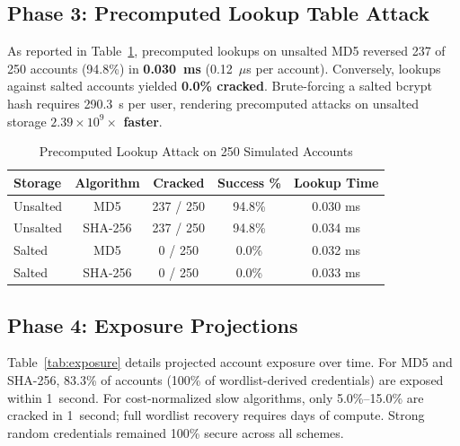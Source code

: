 \documentclass[conference]{IEEEtran}
\begin{document}
\subsection{Phase 3: Precomputed Lookup Table Attack}
As reported in Table~\ref{tab:rainbow}, precomputed lookups on unsalted MD5 reversed 237 of 250 accounts (94.8\%) in \textbf{0.030~ms} (0.12~$\mu$s per account). Conversely, lookups against salted accounts yielded \textbf{0.0\% cracked}. Brute-forcing a salted bcrypt hash requires 290.3~s per user, rendering precomputed attacks on unsalted storage \textbf{$2.39 \times 10^9\times$ faster}.

\begin{table}[htbp]
\caption{Precomputed Lookup Attack on 250 Simulated Accounts}
\begin{center}
\begin{tabular}{lcccc}
\toprule
\textbf{Storage} & \textbf{Algorithm} & \textbf{Cracked} & \textbf{Success \%} & \textbf{Lookup Time} \\
\midrule
Unsalted & MD5 & 237 / 250 & 94.8\% & 0.030 ms \\
Unsalted & SHA-256 & 237 / 250 & 94.8\% & 0.034 ms \\
Salted & MD5 & 0 / 250 & 0.0\% & 0.032 ms \\
Salted & SHA-256 & 0 / 250 & 0.0\% & 0.033 ms \\
\bottomrule
\end{tabular}
\label{tab:rainbow}
\end{center}
\end{table}

\subsection{Phase 4: Exposure Projections}
Table~\ref{tab:exposure} details projected account exposure over time. For MD5 and SHA-256, 83.3\% of accounts (100\% of wordlist-derived credentials) are exposed within 1~second. For cost-normalized slow algorithms, only 5.0\%--15.0\% are cracked in 1~second; full wordlist recovery requires days of compute. Strong random credentials remained 100\% secure across all schemes.
\end{document}
